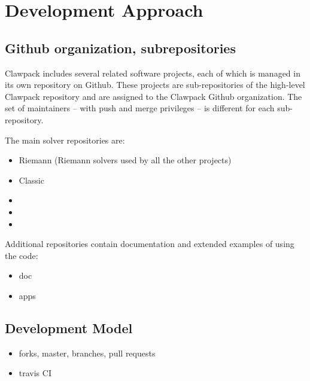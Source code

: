 %
%
%

\section{Development Approach}

\subsection{Github organization, subrepositories}
Clawpack includes several related software projects, each of which is managed in its own repository on Github.  These projects are sub-repositories of the high-level Clawpack repository and are assigned to the Clawpack Github organization.  The set of maintainers -- with push and merge privileges -- is different for each sub-repository.

The main solver repositories are:
\begin{itemize}
    \item Riemann (Riemann solvers used by all the other projects)
    \item Classic
    \item \amrclaw
    \item \geoclaw
    \item \pyclaw
\end{itemize}

Additional repositories contain documentation and extended examples of using the code:
\begin{itemize}
    \item doc
    \item apps
\end{itemize}

\subsection{Development Model}
\begin{itemize}
    \item forks, master, branches, pull requests
    \item travis CI
\end{itemize}

